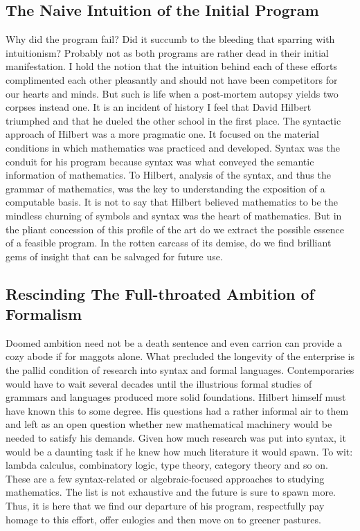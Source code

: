 \documentclass[12pt]{article}
\begin{document}
\subsection{The Naive Intuition of the Initial Program}
Why did the program fail? Did it succumb to the bleeding that sparring with
intuitionism? Probably not as both programs are rather dead in their initial
manifestation. I hold the notion that the intuition behind each of these
efforts complimented each other pleasantly and should not have been competitors
for our hearts and minds. But such is life when a post-mortem autopsy yields
two corpses instead one. It is an incident of history I feel that David Hilbert
triumphed and that he dueled the other school in the first place. The syntactic
approach of Hilbert was a more pragmatic one. It focused on the material
conditions in which mathematics was practiced and developed. Syntax was the
conduit for his program because syntax was what conveyed the semantic
information of mathematics. To Hilbert, analysis of the syntax, and thus the
grammar of mathematics, was the key to understanding the exposition of a
computable basis. It is not to say that Hilbert believed mathematics to be the
mindless churning of symbols and syntax was the heart of mathematics. But in
the pliant concession of this profile of the art do we extract the possible
essence of a feasible program. In the rotten carcass of its demise, do we find
brilliant gems of insight that can be salvaged for future use.

\subsection{Rescinding The Full-throated Ambition of Formalism}
Doomed ambition need not be a death sentence and even carrion can provide a
cozy abode if for maggots alone. What precluded the longevity of the enterprise
is the pallid condition of research into syntax and formal languages.
Contemporaries would have to wait several decades until the illustrious formal
studies of grammars and languages produced more solid foundations. Hilbert
himself must have known this to some degree. His questions had a rather
informal air to them and left as an open question whether new mathematical
machinery would be needed to satisfy his demands. Given how much research was
put into syntax, it would be a daunting task if he knew how much literature it
would spawn. To wit: lambda calculus, combinatory logic, type theory, category
theory and so on. These are a few syntax-related or algebraic-focused
approaches to studying mathematics. The list is not exhaustive and the future
is sure to spawn more. Thus, it is here that we find our departure of his
program, respectfully pay homage to this effort, offer eulogies and then move
on to greener pastures.
\end{document}
